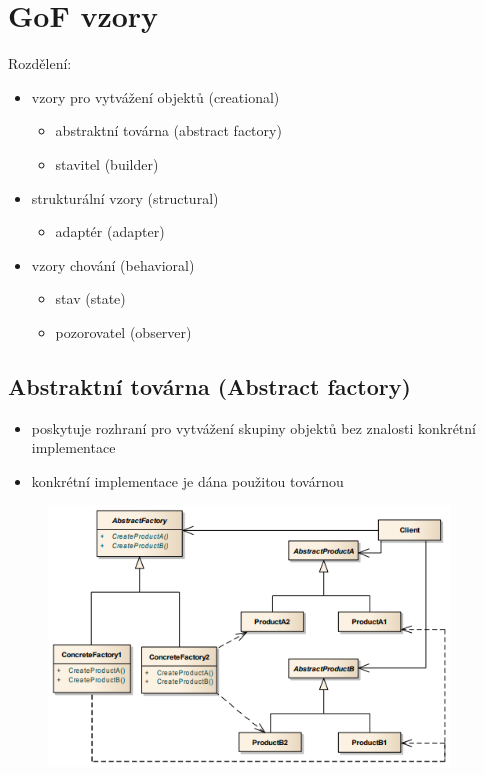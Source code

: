 \documentclass{szzclass}
\begin{document}
\section{GoF vzory}
Rozdělení:
\begin{itemize}
    \item vzory pro vytvážení objektů (creational)
    \begin{itemize}
        \item abstraktní továrna (abstract factory)
        \item stavitel (builder)
    \end{itemize}
    \item strukturální vzory (structural)
    \begin{itemize}
        \item adaptér (adapter)
    \end{itemize}
    \item vzory chování (behavioral)
    \begin{itemize}
        \item stav (state)
        \item pozorovatel (observer)
    \end{itemize}
\end{itemize}
\subsection{Abstraktní továrna (Abstract factory)}
\begin{itemize}
    \item poskytuje rozhraní pro vytvážení skupiny objektů bez znalosti konkrétní implementace
    \item konkrétní implementace je dána použitou továrnou
\end{itemize}
\begin{figure}[h!]
    \includegraphics[width=0.95\textwidth]{topics/bi-wsi-si-19/images/abstractFactory.png}
\end{figure}
\end{document}
